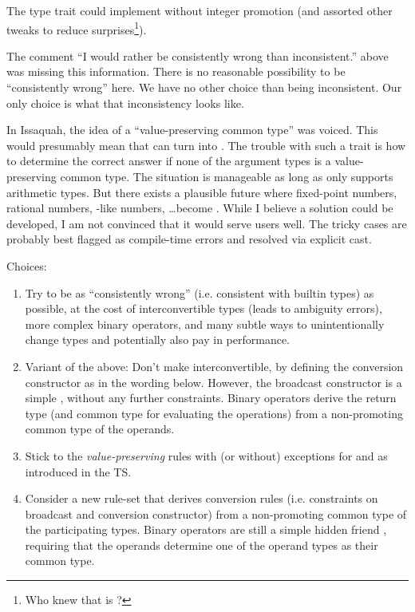 The type trait  could implement
 without integer promotion (and assorted other tweaks to
reduce surprises\footnote{Who knew that
 is
?}).

The comment ``I would rather be consistently wrong than inconsistent.'' above
was missing this information.
There is no reasonable possibility to be ``consistently wrong'' here.
We have no other choice than being inconsistent.
Our only choice is what that inconsistency looks like.

In Issaquah, the idea of a ``value-preserving common type'' was voiced.
This would presumably mean that  can turn into .
The trouble with such a trait is how to determine the correct answer if none of
the argument types is a value-preserving common type.
The situation is manageable as long as  only supports arithmetic types.
But there exists a plausible future where fixed-point numbers, rational numbers,
-like numbers, \ldots become .
While I believe a solution could be developed, I am not convinced that it would
serve users well.
The tricky cases are probably best flagged as compile-time errors and resolved
via explicit cast.

Choices:
\begin{enumerate}
  \item Try to be as “consistently wrong” (i.e. consistent with builtin types)
    as possible, at the cost of interconvertible types (leads to ambiguity
    errors), more complex binary operators, and many subtle ways to
    unintentionally change types and potentially also pay in performance.

  \item\label{enum:binaryoptemplates} Variant of the above: Don't make \simd
    interconvertible, by defining the \simd conversion constructor as in the
    wording below.
    However, the broadcast constructor is a simple ,
    without any further constraints.
    Binary operators derive the return type (and common type for evaluating the
    operations) from a non-promoting common type of the operands.

  \item\label{enum:valuepreserving} Stick to the \emph{value-preserving} rules
    with (or without) exceptions for  and  as
    introduced in the TS.

  \item\label{enum:commontype} Consider a new rule-set that derives conversion
    rules (i.e. constraints on broadcast and conversion constructor) from a
    non-promoting common type of the participating types.
    Binary operators are still a simple hidden friend , requiring that the operands determine one of the
    operand types as their common type.
\end{enumerate}

